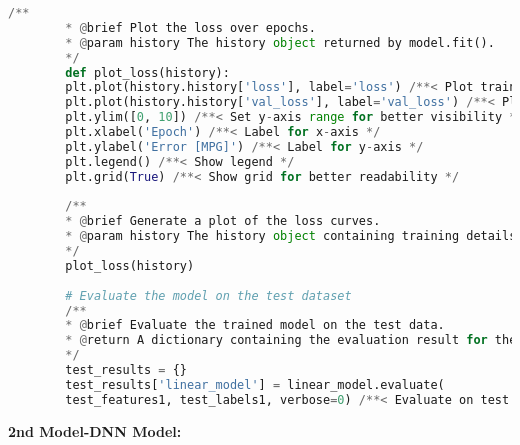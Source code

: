 \begin{lstlisting}[language=Python]
		/**
		* @brief Plot the loss over epochs.
		* @param history The history object returned by model.fit().
		*/
		def plot_loss(history):
		plt.plot(history.history['loss'], label='loss') /**< Plot training loss */
		plt.plot(history.history['val_loss'], label='val_loss') /**< Plot validation loss */
		plt.ylim([0, 10]) /**< Set y-axis range for better visibility */
		plt.xlabel('Epoch') /**< Label for x-axis */
		plt.ylabel('Error [MPG]') /**< Label for y-axis */
		plt.legend() /**< Show legend */
		plt.grid(True) /**< Show grid for better readability */
		
		/**
		* @brief Generate a plot of the loss curves.
		* @param history The history object containing training details.
		*/
		plot_loss(history)
		
		# Evaluate the model on the test dataset
		/**
		* @brief Evaluate the trained model on the test data.
		* @return A dictionary containing the evaluation result for the linear model.
		*/
		test_results = {}
		test_results['linear_model'] = linear_model.evaluate(
		test_features1, test_labels1, verbose=0) /**< Evaluate on test data */
	\end{lstlisting}
	
	\pagebreak
	\textbf{2nd Model-DNN Model:}
	
